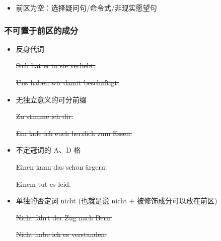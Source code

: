 \begin{itemize}
    \item 前区为空：选择疑问句/命令式/非现实愿望句

\end{itemize}

\subsubsection{不可置于前区的成分}
\begin{itemize}
    \item 反身代词

    \sout{Sich hat er in sie verliebt.}

    \sout{Uns haben wir damit beschäftigt.}

    \item 无独立意义的可分前缀

    \sout{Zu stimme ich dir.}

    \sout{Ein lade ich euch herzlich zum Essen.}

    \item 不定冠词的 A、D 格

    \sout{Einen kann das schon ärgern.}

    \sout{Einem tut es leid.}

    \item 单独的否定词 nicht (也就是说 nicht + 被修饰成分可以放在前区)
    
    \sout{Nicht fährt der Zug nach Bern.}

    \sout{Nicht habe ich es verstanden.}


\end{itemize}

